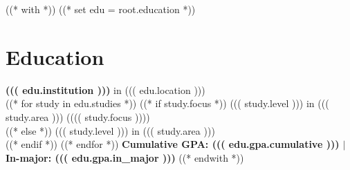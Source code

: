 ((* with *))
((* set edu = root.education *))
\section{Education}\relax
    \textbf{((( edu.institution )))} \small{in ((( edu.location )))}\\
((* for study in edu.studies *))
        ((* if study.focus *))
    ((( study.level ))) in ((( study.area ))) (((( study.focus ))))\\
        ((* else *))
    ((( study.level ))) in ((( study.area )))\\
        ((* endif *))
((* endfor *))
    \textbf{Cumulative GPA: ((( edu.gpa.cumulative ))) $|$ In-major: ((( edu.gpa.in_major )))}
((* endwith *))

